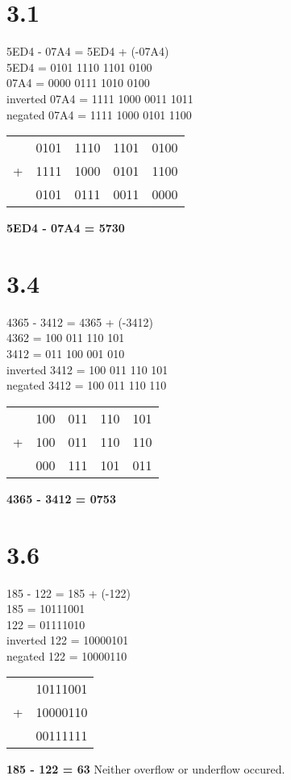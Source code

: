 \documentclass[12pt]{article}
\begin{document}
\section*{3.1}
5ED4 - 07A4 = 5ED4 + (-07A4)\\
\newline
5ED4 = 0101 1110 1101 0100\\
07A4 = 0000 0111 1010 0100\\
inverted 07A4 = 1111 1000 0011 1011\\
negated 07A4 = 1111 1000 0101 1100\\
\newline
\begin{tabular}{ccccc}
	& 0101 & 1110 & 1101 & 0100\\
	+& 1111 & 1000 & 0101 & 1100\\
	\hline
	& 0101 & 0111 & 0011 & 0000 
\end{tabular}
\newline
\newline
\textbf{5ED4 - 07A4 = 5730}\\

\section*{3.4}
4365 - 3412 = 4365 + (-3412)\\
4362 = 100 011 110 101\\
3412 = 011 100 001 010\\
inverted 3412 = 100 011 110 101\\
negated 3412 = 100 011 110 110\\
\newline
\begin{tabular}{ccccc}
	& 100 & 011 & 110 & 101\\
	+& 100 & 011 & 110 & 110\\
	\hline
	& 000 & 111 & 101 & 011 
\end{tabular}
\newline
\newline
\textbf{4365 - 3412 = 0753}\\

\section*{3.6}
185 - 122 = 185 + (-122)\\
185 = 10111001\\
122 = 01111010\\
inverted 122 = 10000101\\
negated 122 = 10000110\\
\begin{tabular}{cc}
	&10111001\\
	+& 10000110\\
	\hline
	& 00111111 
\end{tabular}
\newline
\newline
\textbf{185 - 122 = 63}
\newline
Neither overflow or underflow occured.
\end{document}
